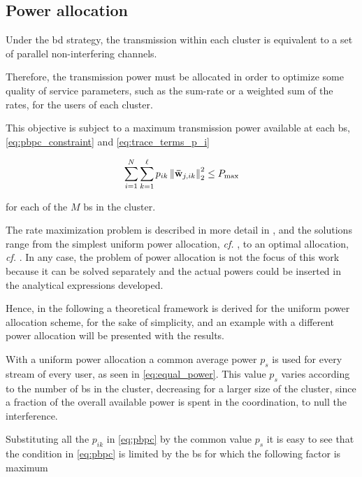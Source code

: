 \subsection{Power allocation}\label{ssec:achiev_rate_power}

Under the \gls{bd} strategy, the transmission within each cluster is equivalent
to a set of parallel non-interfering channels.

Therefore, the transmission power must be allocated in order to optimize some
quality of service parameters, such as the sum-rate or a weighted sum of the
rates, for the users of each cluster.

This objective is subject to a maximum transmission power available at each
\gls{bs}, \eqref{eq:pbpc_constraint} and \eqref{eq:trace_terms_p_i}

\begin{equation} \label{eq:pbpc}
	\sum\limits_{i = 1}^N \sum\limits_{k = 1}^\ell p_{ik} \left\| \mathbf{\bar{w}}_{j, ik}
    \right\|_2^2 \leq P_{\max}
\end{equation}

\noindent
for each of the $M$ \gls{bs} in the cluster.

The rate maximization problem is described in more detail in
, and the solutions range from the simplest uniform
power allocation, \emph{cf.} , to an optimal
allocation, \emph{cf.} . In any case, the
problem of power allocation is not the focus of this work because it can be
solved separately and the actual powers could be inserted in the analytical
expressions developed.

Hence, in the following a theoretical framework is derived for the uniform power
allocation scheme, for the sake of simplicity, and an example with a different
power allocation will be presented with the results.

With a uniform power allocation a common average power $p_s$ is used for every
stream of every user, as seen in \eqref{eq:equal_power}. This value $p_s$ varies
according to the number of \gls{bs} in the cluster, decreasing for a larger size
of the cluster, since a fraction of the overall available power is spent in the
coordination, to null the interference.

Substituting all the $p_{ik}$ in \eqref{eq:pbpc} by the common value $p_s$ it is
easy to see that the condition in \eqref{eq:pbpc} is limited by the \gls{bs} for
which the following factor is maximum

